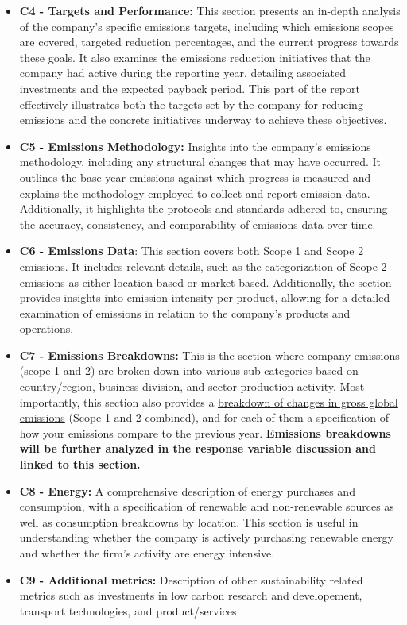 \begin{itemize}
    \item \textbf{C4 - Targets and Performance:} This section presents an in-depth analysis of the company's specific emissions targets, including which emissions scopes are covered, targeted reduction percentages, and the current progress towards these goals. It also examines the emissions reduction initiatives that the company had active during the reporting year, detailing associated investments and the expected payback period. This part of the report effectively illustrates both the targets set by the company for reducing emissions and the concrete initiatives underway to achieve these objectives.
    \item \textbf{C5 - Emissions Methodology:} Insights into the company's emissions methodology, including any structural changes that may have occurred. It outlines the base year emissions against which progress is measured and explains the methodology employed to collect and report emission data. Additionally, it highlights the protocols and standards adhered to, ensuring the accuracy, consistency, and comparability of emissions data over time.
    \item \textbf{C6 - Emissions Data}: This section covers both Scope 1 and Scope 2 emissions. It includes relevant details, such as the categorization of Scope 2 emissions as either location-based or market-based. Additionally, the section provides insights into emission intensity per product, allowing for a detailed examination of emissions in relation to the company's products and operations. 
    \item \textbf{C7 - Emissions Breakdowns:} This is the section where company emissions (scope 1 and 2) are broken down into various sub-categories based on country/region, business division, and sector production activity. Most importantly, this section also provides a \underline{breakdown of changes in gross global emissions} (Scope 1 and 2 combined), and for each of them a specification of how your emissions compare to the previous year. \textbf{Emissions breakdowns will be further analyzed in the response variable discussion and linked to this section.}
    \item \textbf{C8 - Energy:} A comprehensive description of energy purchases and consumption, with a specification of renewable and non-renewable sources as well as consumption breakdowns by location. This section is useful in understanding whether the company is actively purchasing renewable energy and whether the firm's activity are energy intensive. 
    \item \textbf{C9 - Additional metrics:} Description of other sustainability related metrics such as investments in low carbon research and developement, transport technologies, and product/services

\end{itemize}
